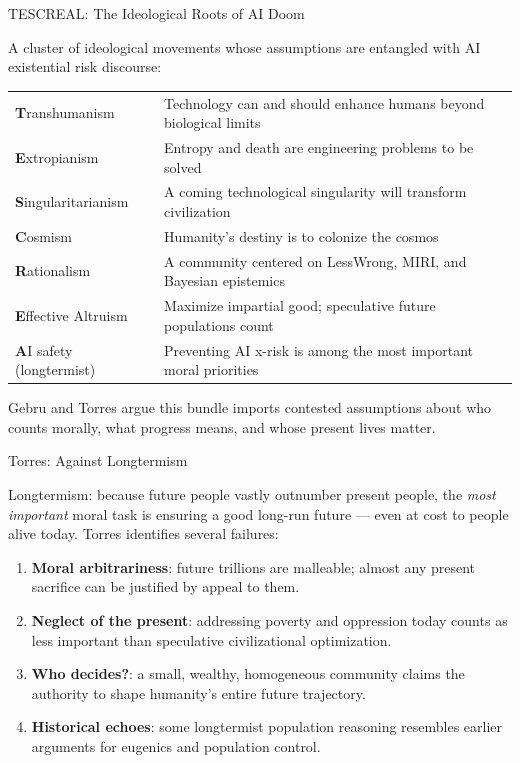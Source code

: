 \documentclass[aspectratio=169,11pt]{beamer}
\begin{document}
\begin{frame}{TESCREAL: The Ideological Roots of AI Doom}
\begin{conceptbox}
A cluster of ideological movements whose assumptions are entangled with AI existential risk discourse:
\vspace{0.1cm}

\scriptsize
\begin{tabular}{@{}p{2.8cm}p{8.7cm}@{}}
\toprule
\textbf{T}ranshumanism & Technology can and should enhance humans beyond biological limits \\
\textbf{E}xtropianism & Entropy and death are engineering problems to be solved \\
\textbf{S}ingularitarianism & A coming technological singularity will transform civilization \\
\textbf{C}osmism & Humanity's destiny is to colonize the cosmos \\
\textbf{R}ationalism & A community centered on LessWrong, MIRI, and Bayesian epistemics \\
\textbf{E}ffective Altruism & Maximize impartial good; speculative future populations count \\
\textbf{A}I safety (longtermist) & Preventing AI x-risk is among the most important moral priorities \\
\bottomrule
\end{tabular}
\vspace{0.1cm}

\parencite{gebru_torres_tescreal_2024}
\end{conceptbox}
Gebru and Torres argue this bundle imports contested assumptions about who counts morally, what progress means, and whose present lives matter.
\end{frame}

\begin{frame}[shrink=18]{Torres: Against Longtermism}
\begin{objectionbox}
Longtermism: because future people vastly outnumber present people, the \emph{most important} moral task is ensuring a good long-run future --- even at cost to people alive today. Torres identifies several failures:
\begin{enumerate}
    \item \textbf{Moral arbitrariness}: future trillions are malleable; almost any present sacrifice can be justified by appeal to them.
    \item \textbf{Neglect of the present}: addressing poverty and oppression today counts as less important than speculative civilizational optimization.
    \item \textbf{Who decides?}: a small, wealthy, homogeneous community claims the authority to shape humanity's entire future trajectory.
    \item \textbf{Historical echoes}: some longtermist population reasoning resembles earlier arguments for eugenics and population control.
\end{enumerate}
\end{objectionbox}
\parencite{torres_against_longtermism_2021}
\end{frame}
\end{document}
